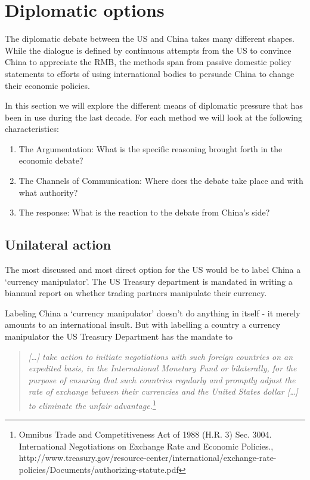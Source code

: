 \section{Diplomatic options}
\label{sec:diplomacy}


The diplomatic debate between the US and China takes many different 
shapes. While the dialogue is defined by continuous attempts from the US 
to convince China to appreciate the RMB, the methods span from passive 
domestic policy statements to efforts of using international bodies to 
persuade China to change their economic policies.

In this section we will explore the different means of diplomatic 
pressure that has been in use during the last decade. For each method we 
will look at the following characteristics:

\begin{enumerate}
	\item{The Argumentation: What is the specific reasoning brought 
		forth in the economic debate?}
	\item{The Channels of Communication: Where does the debate take 
		place and with what authority?}
	\item{The response: What is the reaction to the debate from China's 
		side?}
\end{enumerate}



\subsection{Unilateral action}

The most discussed and most direct option for the US would be to label China a `currency manipulator'. The US Treasury department is mandated in writing a biannual report on whether trading partners manipulate their currency.  

Labeling China a `currency manipulator' doesn't do anything in itself - 
it merely amounts to an international insult. But with labelling a 
country a currency manipulator the US Treasury Department has the 
mandate to
\begin{quotation}
\emph{[\dots] take action to initiate negotiations with such foreign 
	countries on an expedited basis, in the International Monetary Fund 
	or bilaterally, for the purpose of ensuring that such countries 
	regularly and promptly adjust the rate of exchange between their 
	currencies and the United States dollar [\dots] to eliminate the 
unfair advantage.}\footnote{Omnibus Trade and Competitiveness Act of 
1988 (H.R.  3) Sec. 3004. International Negotiations on Exchange Rate 
and Economic Policies., 
http://www.treasury.gov/resource-center/international/exchange-rate-policies/Documents/authorizing-statute.pdf}
\end{quotation}


